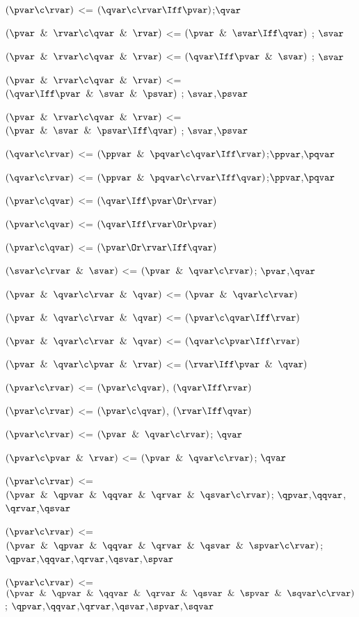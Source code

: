 $(\pvar \c \rvar)$ <=  $(\qvar \c \rvar\Iff \pvar)$;$\qvar$

$(\pvar \And \rvar \c \qvar \And \rvar)$ <= $(\pvar \And \svar \Iff \qvar)$ ; $\svar$

$(\pvar \And \rvar \c \qvar \And \rvar)$ <= $(\qvar \Iff \pvar \And \svar)$ ; $\svar$

$(\pvar \And \rvar \c \qvar \And \rvar)$ <= $(\qvar \Iff \pvar \And \svar \And \psvar)$ ; $\svar$,$\psvar$

$(\pvar \And \rvar \c \qvar \And \rvar)$ <= $(\pvar \And \svar \And \psvar \Iff \qvar)$ ; $\svar$,$\psvar$

$(\qvar \c \rvar)$ <=  $(\ppvar \And \pqvar\c \qvar\Iff \rvar)$;$\ppvar$,$\pqvar$

$(\qvar \c \rvar)$ <=  $(\ppvar \And \pqvar \c \rvar\Iff \qvar)$;$\ppvar$,$\pqvar$

$(\pvar \c \qvar)$ <= $(\qvar \Iff \pvar \Or \rvar)$

$(\pvar \c \qvar)$ <= $(\qvar \Iff \rvar \Or \pvar)$

$(\pvar \c \qvar)$ <= $(\pvar \Or \rvar\Iff \qvar)$

$(\svar \c \rvar \And \svar)$ <= $(\pvar \And \qvar \c \rvar)$; $\pvar$,$\qvar$

$(\pvar \And \qvar \c \rvar \And \qvar)$ <= $(\pvar \And \qvar \c \rvar)$

$(\pvar \And \qvar \c \rvar \And \qvar)$ <= $(\pvar \c  \qvar \Iff \rvar)$

$(\pvar \And \qvar \c \rvar \And \qvar)$ <= $(\qvar \c  \pvar \Iff \rvar)$

$(\pvar \And \qvar \c \pvar \And \rvar)$ <= $( \rvar \Iff \pvar \And \qvar) $

$(\pvar \c \rvar)$ <= $(\pvar \c \qvar)$, $(\qvar \Iff \rvar)$

$(\pvar \c \rvar)$ <= $(\pvar \c \qvar)$, $(\rvar \Iff \qvar)$

$(\pvar \c \rvar)$ <= $(\pvar \And \qvar \c \rvar)$; $\qvar$

$(\pvar \c \pvar \And \rvar)$ <= $(\pvar \And \qvar \c \rvar)$; $\qvar$

$(\pvar \c \rvar)$ <= $(\pvar \And \qpvar \And \qqvar\And \qrvar\And \qsvar \c \rvar)$; $\qpvar$,$\qqvar$,$\qrvar$,$\qsvar$

$(\pvar \c \rvar)$ <= $(\pvar \And \qpvar \And \qqvar\And \qrvar\And \qsvar \And \spvar \c \rvar)$; $\qpvar$,$\qqvar$,$\qrvar$,$\qsvar$,$\spvar$

$(\pvar \c \rvar)$ <= $(\pvar \And \qpvar \And \qqvar\And \qrvar\And \qsvar \And \spvar \And \sqvar\c \rvar)$; $\qpvar$,$\qqvar$,$\qrvar$,$\qsvar$,$\spvar$,$\sqvar$

